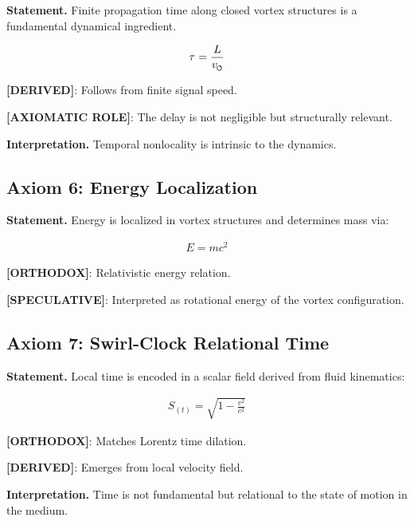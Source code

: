         \textbf{Statement.}
        Finite propagation time along closed vortex structures is a fundamental dynamical ingredient.
        
        \begin{align}
            \tau = \frac{L}{v_{\swirlarrow}}
        \end{align}
        
        \textbf{[DERIVED]}: Follows from finite signal speed.
        
        \textbf{[AXIOMATIC ROLE]}: The delay is not negligible but structurally relevant.
        
        \textbf{Interpretation.}
        Temporal nonlocality is intrinsic to the dynamics.
    
    \subsection{Axiom 6: Energy Localization}
        
        \textbf{Statement.}
        Energy is localized in vortex structures and determines mass via:
        
        \begin{align}
            E = m c^2
        \end{align}
        
        \textbf{[ORTHODOX]}: Relativistic energy relation.
        
        \textbf{[SPECULATIVE]}: Interpreted as rotational energy of the vortex configuration.
    
    \subsection{Axiom 7: Swirl-Clock Relational Time}
        
        \textbf{Statement.}
        Local time is encoded in a scalar field derived from fluid kinematics:
        
        \begin{align}
            S_{(t)} = \sqrt{1 - \frac{v^2}{c^2}}
        \end{align}
        
        \textbf{[ORTHODOX]}: Matches Lorentz time dilation.
        
        \textbf{[DERIVED]}: Emerges from local velocity field.
        
        \textbf{Interpretation.}
        Time is not fundamental but relational to the state of motion in the medium.
    
